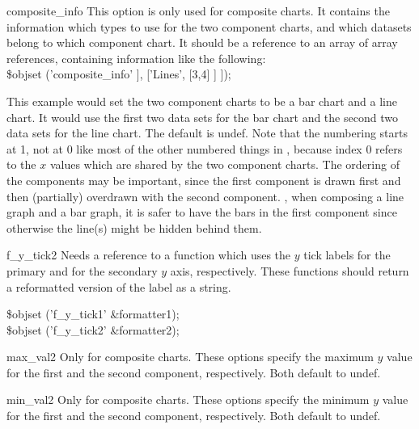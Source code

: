 \begin{AttrDecl}{composite\_info}
This option is only used for composite charts. It contains the
information which types to use for the two component charts, and which
datasets belong to which component chart. It should be a reference to an
array of array references, containing information like the following:\\
\$obj\deref set ('composite\_info' \fatcomma [ ['Bars', [1,2]], ['Lines', [3,4] ] ]);

This example would set the two component charts to be a bar chart and a
line chart. It would use the first two data sets for the bar chart and
the second two data sets for the line chart. The default is undef. Note
that the numbering starts at 1, not at 0 like most of the other numbered
things in , because index 0 refers to the $x$ values which
are shared by the two component charts. The ordering of the components
may be important, since the first component is drawn first and then
(partially) overdrawn with the second component. \Eg, when composing a
line graph and a bar graph, it is safer to have the bars in the first
component since otherwise the line(s) might be hidden behind them.
\end{AttrDecl}

\begin{AttrDecl}{f\_y\_tick2}
Needs a reference to a function which uses the $y$ tick labels for the
primary and for the secondary $y$ axis, respectively. These functions
should return a reformatted version of the label as a string. \Eg
\begin{SmallExample}
\$obj\deref set ('f\_y\_tick1' \fatcomma \bs\&formatter1);\\
\$obj\deref set ('f\_y\_tick2' \fatcomma \bs\&formatter2);
\end{SmallExample}
\end{AttrDecl}

\begin{AttrDecl}{max\_val2}
Only for composite charts. These options specify the maximum $y$ value
for the first and the second component, respectively. Both default to
undef.
\end{AttrDecl}

\begin{AttrDecl}{min\_val2}
Only for composite charts. These options specify the minimum $y$ value
for the first and the second component, respectively. Both default to
undef.
\end{AttrDecl}

